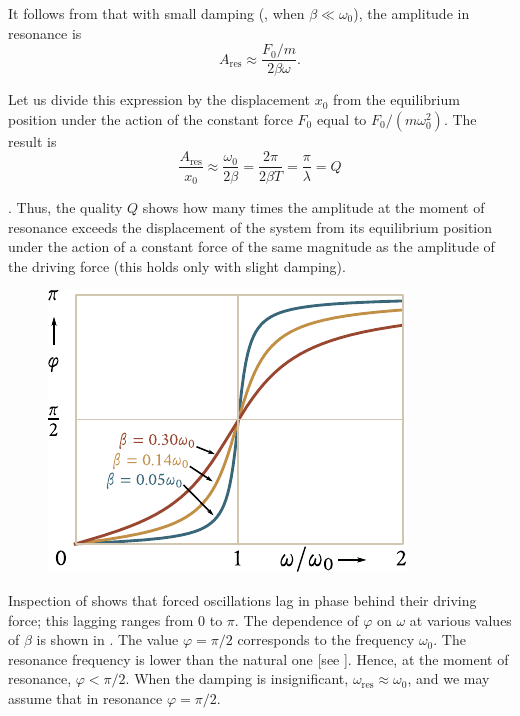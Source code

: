It follows from  that with small damping (\ie, when $\beta\ll\omega_0$), the amplitude in resonance is
\begin{equation*}
	A_{\text{res}} \approx \frac{F_0/m}{2\beta\omega}.
\end{equation*}

\noindent
Let us divide this expression by the displacement $x_0$ from the equilibrium position under the action of the constant force $F_0$ equal to $F_0/(m\omega_0^2)$. The result is
\begin{equation}\label{eq:7_129}
	\frac{A_{\text{res}}}{x_0} \approx \frac{\omega_0}{2\beta} = \frac{2\pi}{2\beta T} = \frac{\pi}{\lambda} = Q
\end{equation}

. Thus, the quality $Q$ shows how many times the amplitude at the moment of resonance exceeds the displacement of the system from its equilibrium position under the action of a constant force of the same magnitude as the amplitude of the driving force (this holds only with slight damping).

\begin{figure}[t]
	\begin{center}
		\includegraphics[scale=0.95]{figures/ch_07/fig_7_25.pdf}
		\caption[]{}
		\label{fig:7_25}
	\end{center}
	\vspace{-0.8cm}
\end{figure}

Inspection of  shows that forced oscillations lag in phase behind their driving force; this lagging ranges from $0$ to $\pi$. The dependence of $\varphi$ on $\omega$ at various values of $\beta$ is shown in . The value $\varphi=\pi/2$ corresponds to the frequency $\omega_0$. The resonance frequency is lower than the natural one [see ]. Hence, at the moment of resonance, $\varphi<\pi/2$. When the damping is insignificant, $\omega_{\text{res}}\approx\omega_0$, and we may assume that in resonance $\varphi=\pi/2$.

